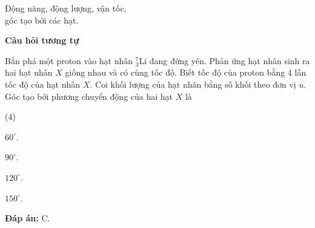 \begin{dang}{Động năng, động lượng, vận tốc,\\ góc tạo bởi các hạt.}
{		\begin{center}
			\textbf{Câu hỏi tương tự}
		\end{center}
		Bắn phá một proton vào hạt nhân $ ^{7}_{3} \text{Li} $ đang đứng yên. Phản ứng hạt nhân sinh ra hai hạt nhân $ X $ giống nhau và có cùng tốc độ. Biết tốc độ của proton bằng $ 4 $ lần tốc độ của hạt nhân $ X $. Coi khối lượng của hạt nhân bằng số khối theo đơn vị $ u $. Góc tạo bởi phương chuyển động của hai hạt $ X $ là 
		\begin{mcq}(4)
			\item $ 60^\circ $.	
			\item $ 90^\circ $.	
			\item $ 120^\circ $.	
			\item $ 150^\circ $.		
		\end{mcq}
		
		\textbf{Đáp án:} C.
	}
	
\end{dang}

